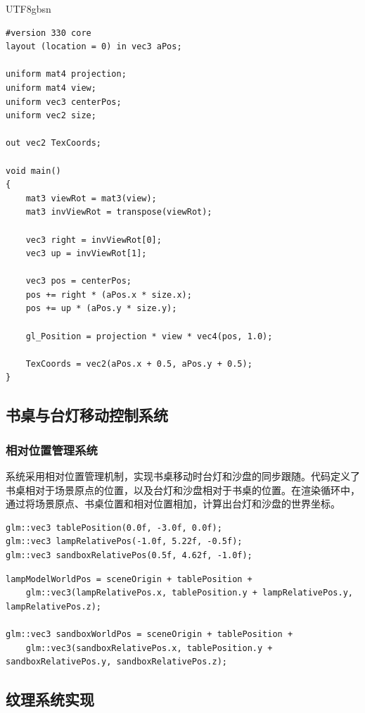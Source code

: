 \documentclass{article}
\begin{document}
\begin{CJK}{UTF8}{gbsn}
\begin{lstlisting}[caption=Billboard顶点着色器核心逻辑]
#version 330 core
layout (location = 0) in vec3 aPos;

uniform mat4 projection;
uniform mat4 view;
uniform vec3 centerPos;
uniform vec2 size;

out vec2 TexCoords;

void main()
{
    mat3 viewRot = mat3(view);
    mat3 invViewRot = transpose(viewRot);
    
    vec3 right = invViewRot[0];
    vec3 up = invViewRot[1];
    
    vec3 pos = centerPos;
    pos += right * (aPos.x * size.x);
    pos += up * (aPos.y * size.y);
    
    gl_Position = projection * view * vec4(pos, 1.0);
    
    TexCoords = vec2(aPos.x + 0.5, aPos.y + 0.5);
}
\end{lstlisting}

\subsection{书桌与台灯移动控制系统}

\subsubsection{相对位置管理系统}
系统采用相对位置管理机制，实现书桌移动时台灯和沙盘的同步跟随。代码定义了书桌相对于场景原点的位置，以及台灯和沙盘相对于书桌的位置。在渲染循环中，通过将场景原点、书桌位置和相对位置相加，计算出台灯和沙盘的世界坐标。

\begin{lstlisting}[caption=相对位置数据结构]
glm::vec3 tablePosition(0.0f, -3.0f, 0.0f);
glm::vec3 lampRelativePos(-1.0f, 5.22f, -0.5f);
glm::vec3 sandboxRelativePos(0.5f, 4.62f, -1.0f);
\end{lstlisting}

\begin{lstlisting}[caption=世界位置计算]
lampModelWorldPos = sceneOrigin + tablePosition + 
    glm::vec3(lampRelativePos.x, tablePosition.y + lampRelativePos.y, lampRelativePos.z);

glm::vec3 sandboxWorldPos = sceneOrigin + tablePosition + 
    glm::vec3(sandboxRelativePos.x, tablePosition.y + sandboxRelativePos.y, sandboxRelativePos.z);
\end{lstlisting}

\subsection{纹理系统实现}


\end{CJK}
\end{document}
